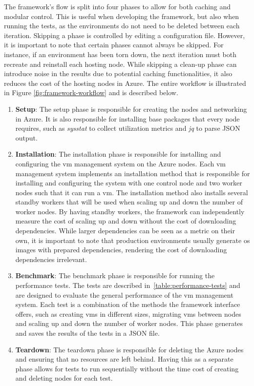 \documentclass{kththesis}
\begin{document}
The framework's flow is split into four phases to allow for both caching and modular control. This is useful when developing the framework, but also when running the tests, as the environments do not need to be deleted between each iteration. Skipping a phase is controlled by editing a configuration file. However, it is important to note that certain phases cannot always be skipped. For instance, if an environment has been torn down, the next iteration must both recreate and reinstall each hosting node. While skipping a clean-up phase can introduce noise in the results due to potential caching functionalities, it also reduces the cost of the hosting nodes in Azure. The entire workflow is illustrated in Figure \ref{fig:framework-workflow} and is described below.
\begin{enumerate}
    \item \textbf{Setup}: The setup phase is responsible for creating the nodes and networking in Azure. It is also responsible for installing base packages that every node requires, such as \textit{sysstat} to collect utilization metrics and \textit{jq} to parse JSON output.
    \item \textbf{Installation}: The installation phase is responsible for installing and configuring the \Gls{vm} management system on the Azure nodes. Each \Gls{vm} management system implements an installation method that is responsible for installing and configuring the system with one control node and two worker nodes such that it can run a \Gls{vm}. The installation method also installs several standby workers that will be used when scaling up and down the number of worker nodes. By having standby workers, the framework can independently measure the cost of scaling up and down without the cost of downloading dependencies. While larger dependencies can be seen as a metric on their own, it is important to note that production environments usually generate \Gls{os} images with prepared dependencies, rendering the cost of downloading dependencies irrelevant.
    \item \textbf{Benchmark}: The benchmark phase is responsible for running the performance tests. The tests are described in\ \ref{table:performance-tests} and are designed to evaluate the general performance of the \Gls{vm} management system. Each test is a combination of the methods the framework interface offers, such as creating \Glspl{vm} in different sizes, migrating \Glspl{vm} between nodes and scaling up and down the number of worker nodes. This phase generates and saves the results of the tests in a JSON file.
    \item \textbf{Teardown}: The teardown phase is responsible for deleting the Azure nodes and ensuring that no resources are left behind. Having this as a separate phase allows for tests to run sequentially without the time cost of creating and deleting nodes for each test. 
\end{enumerate}
\end{document}
